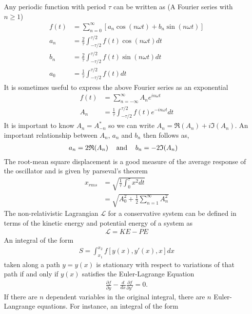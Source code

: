 \begin{multicols}{2}
Any periodic function with period $\tau$ can be written as (A Fourier series with $n \geq 1$)
\begin{align}
f(t)&=\sum_{n=0}^{\infty}[a_n\cos(n\omega t)+b_n\sin(n\omega t)] \\
a_n&= \frac{2}{\tau}\int_{-\tau/2}^{\tau/2}f(t)\cos(n\omega t)dt \\
b_n&= \frac{2}{\tau}\int_{-\tau/2}^{\tau/2}f(t)\sin(n\omega t)dt \\
a_0&= \frac{1}{\tau}\int_{-\tau/2}^{\tau/2}f(t)dt
\end{align}
It is sometimes useful to express the above Fourier series as an exponential
\begin{align}
f(t)&=\sum_{n=-\infty}^{\infty}A_ne^{in\omega t} \\
A_n&=\frac{1}{\tau}\int_{-\tau/2}^{\tau/2}f(t)e^{-in\omega t}dt
\end{align} 
It is important to know $A_n=A^*_{-n}$ so we can write $A_n=\mathfrak{R}(A_n)+i\mathfrak{I}(A_n)$. An important relationship between $A_n$, $a_n$ and $b_n$ then follows as, 
\begin{align}
a_n&=2\mathfrak{R}(A_n)\hspace{0.3cm}\textrm{ and }\hspace{0.3cm} b_n=-2\mathfrak{I}(A_n)
\end{align}
The root-mean square displacement is a good measure of the average response of the oscillator and is given by parseval's theorem
\begin{align}
x_{rms}&=\sqrt{\frac{1}{\tau}\int_{0}^{\tau}x^2dt} \\ &=
\sqrt{A_0^2+\frac{1}{2}\sum_{n=1}^{\infty}A_n^2}
\end{align}
The non-relativistic Lagrangian $\mathcal{L}$ for a conservative system can be defined in terms of the kinetic energy and potential energy of a system as
\begin{align}
\mathcal{L}=KE-PE
\end{align}
An integral of the form
\begin{align}
S=\int_{x_1}^{x_2}f[y(x),y'(x),x]dx
\end{align}
taken along a path $y=y(x)$ is stationary with respect to variations of that path if and only if $y(x)$ satisfies the Euler-Lagrange Equation
\begin{align}
\frac{\partial f}{\partial y}-\frac{d}{dx}\frac{\partial f}{\partial y'}=0.
\end{align}
If there are $n$ dependent variables in the original integral, there are $n$ Euler-Langrange equations. For instance, an integral of the form

\end{multicols}
